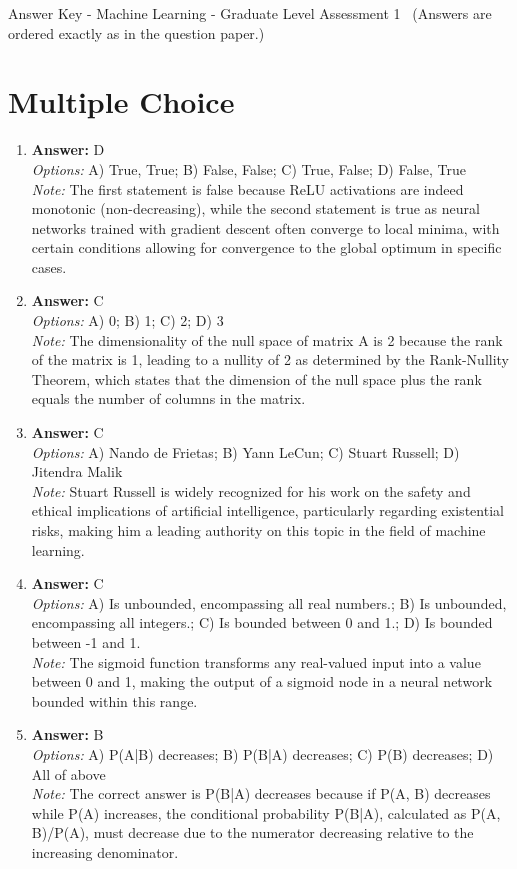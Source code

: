 \documentclass[12pt]{article}
\begin{document}
\begin{center}
Answer Key - Machine Learning - Graduate Level Assessment 1 \
\small (Answers are ordered exactly as in the question paper.)
\end{center}

\section*{Multiple Choice}
\begin{enumerate}[label=\arabic*.]
\item \textbf{Answer:} D
\\ \textit{Options:} A) True, True; B) False, False; C) True, False; D) False, True
\\ \textit{Note:} The first statement is false because ReLU activations are indeed monotonic (non-decreasing), while the second statement is true as neural networks trained with gradient descent often converge to local minima, with certain conditions allowing for convergence to the global optimum in specific cases.
\item \textbf{Answer:} C
\\ \textit{Options:} A) 0; B) 1; C) 2; D) 3
\\ \textit{Note:} The dimensionality of the null space of matrix A is 2 because the rank of the matrix is 1, leading to a nullity of 2 as determined by the Rank-Nullity Theorem, which states that the dimension of the null space plus the rank equals the number of columns in the matrix.
\item \textbf{Answer:} C
\\ \textit{Options:} A) Nando de Frietas; B) Yann LeCun; C) Stuart Russell; D) Jitendra Malik
\\ \textit{Note:} Stuart Russell is widely recognized for his work on the safety and ethical implications of artificial intelligence, particularly regarding existential risks, making him a leading authority on this topic in the field of machine learning.
\item \textbf{Answer:} C
\\ \textit{Options:} A) Is unbounded, encompassing all real numbers.; B) Is unbounded, encompassing all integers.; C) Is bounded between 0 and 1.; D) Is bounded between -1 and 1.
\\ \textit{Note:} The sigmoid function transforms any real-valued input into a value between 0 and 1, making the output of a sigmoid node in a neural network bounded within this range.
\item \textbf{Answer:} B
\\ \textit{Options:} A) P(A|B) decreases; B) P(B|A) decreases; C) P(B) decreases; D) All of above
\\ \textit{Note:} The correct answer is P(B|A) decreases because if P(A, B) decreases while P(A) increases, the conditional probability P(B|A), calculated as P(A, B)/P(A), must decrease due to the numerator decreasing relative to the increasing denominator.
\end{enumerate}
\end{document}
